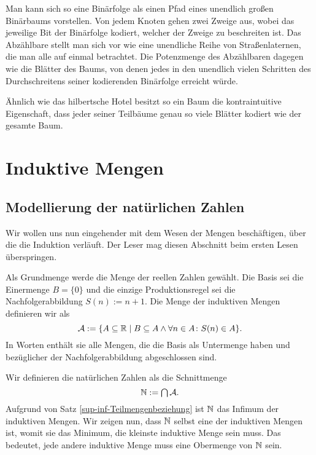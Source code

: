 Man kann sich so eine Binärfolge als einen Pfad eines unendlich großen
Binärbaums vorstellen. Von jedem Knoten gehen zwei Zweige aus, wobei
das jeweilige Bit der Binärfolge kodiert, welcher der Zweige zu
beschreiten ist. Das Abzählbare stellt man sich vor wie eine
unendliche Reihe von Straßenlaternen, die man alle auf einmal
betrachtet. Die Potenzmenge des Abzählbaren dagegen wie die Blätter
des Baums, von denen jedes in den unendlich vielen Schritten des
Durchschreitens seiner kodierenden Binärfolge erreicht würde.

Ähnlich wie das hilbertsche Hotel besitzt so ein Baum die kontraintuitive
Eigenschaft, dass jeder seiner Teilbäume genau so viele Blätter
kodiert wie der gesamte Baum.

\section{Induktive Mengen}

\subsection{Modellierung der natürlichen Zahlen}

Wir wollen uns nun eingehender mit dem Wesen der Mengen beschäftigen,
über die die Induktion verläuft. Der Leser mag diesen Abschnitt
beim ersten Lesen überspringen.

Als Grundmenge werde die Menge der reellen Zahlen gewählt. Die Basis sei
die Einermenge $B=\{0\}$ und die einzige Produktionsregel sei die
Nachfolgerabbildung $S(n):=n+1$. Die Menge der induktiven Mengen definieren
wir als
\[\mathcal{A} := \{A\subseteq\mathbb R\mid
B\subseteq A\land\forall n\in A\colon S(n)\in A\}.\]
In Worten enthält sie alle Mengen, die die Basis als Untermenge
haben und bezüglicher der Nachfolgerabbildung abgeschlossen sind.

Wir definieren die natürlichen Zahlen als die Schnittmenge
\[\textstyle\mathbb N := \bigcap\mathcal{A}.\]
Aufgrund von Satz \ref{sup-inf-Teilmengenbeziehung} ist $\mathbb N$ das Infimum
der induktiven Mengen. Wir zeigen nun, dass $\mathbb N$ selbst eine der
induktiven Mengen ist, womit sie das Minimum, die kleinste
induktive Menge sein muss. Das bedeutet, jede andere induktive Menge
muss eine Obermenge von $\mathbb N$ sein.

